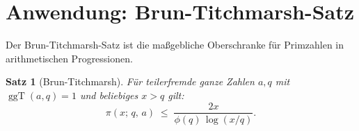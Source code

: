 \documentclass[12pt,a4paper]{amsart}
\newtheorem{theorem}{Satz}[section]
\theoremstyle{definition}
\DeclareMathOperator{\ggT}{ggT}
\begin{document}
\section{Anwendung: Brun-Titchmarsh-Satz}
\label{sec:brun_titchmarsh}

Der Brun-Titchmarsh-Satz ist die maßgebliche Oberschranke für Primzahlen
in arithmetischen Progressionen.

\begin{theorem}[Brun-Titchmarsh]\label{thm:brun_titchmarsh}
  Für teilerfremde ganze Zahlen $a, q$ mit $\ggT(a,q) = 1$ und beliebiges $x > q$ gilt:
  \[
    \pi(x;\,q,\,a)
    \;\leq\; \frac{2x}{\phi(q)\,\log(x/q)}.
  \]
\end{theorem}
\end{document}
